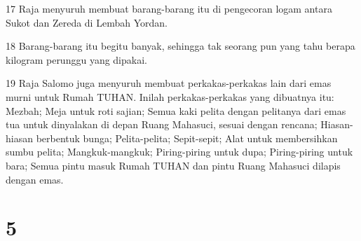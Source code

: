 \par 17 Raja menyuruh membuat barang-barang itu di pengecoran logam antara Sukot dan Zereda di Lembah Yordan.
\par 18 Barang-barang itu begitu banyak, sehingga tak seorang pun yang tahu berapa kilogram perunggu yang dipakai.
\par 19 Raja Salomo juga menyuruh membuat perkakas-perkakas lain dari emas murni untuk Rumah TUHAN. Inilah perkakas-perkakas yang dibuatnya itu: Mezbah; Meja untuk roti sajian; Semua kaki pelita dengan pelitanya dari emas tua untuk dinyalakan di depan Ruang Mahasuci, sesuai dengan rencana; Hiasan-hiasan berbentuk bunga; Pelita-pelita; Sepit-sepit; Alat untuk membersihkan sumbu pelita; Mangkuk-mangkuk; Piring-piring untuk dupa; Piring-piring untuk bara; Semua pintu masuk Rumah TUHAN dan pintu Ruang Mahasuci dilapis dengan emas.

\chapter{5}

